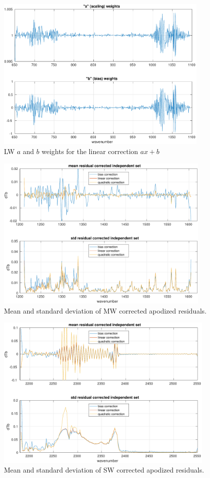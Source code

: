 \documentclass[11pt]{article}
\begin{document}
\begin{figure} %
  \centering
  \includegraphics[height=7.5cm]{figures/a2cris_coef_LW.pdf}
  \caption{LW $a$ and $b$ weights for the linear correction $ax+b$}
  \label{coefLW}
\end{figure}

\begin{figure} %
  \centering
  \includegraphics[height=7.5cm]{figures/a2cris_regr_MW.pdf}
  \caption{Mean and standard deviation of MW corrected apodized
    residuals.}
  \label{statMW}
\end{figure}

\begin{figure} %
  \centering
  \includegraphics[height=7.5cm]{figures/a2cris_regr_SW.pdf}
  \caption{Mean and standard deviation of SW corrected apodized
    residuals.}
  \label{statSW}
\end{figure}
\end{document}
